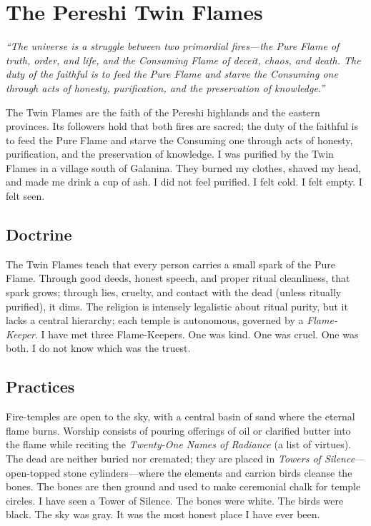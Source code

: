 \documentclass{book}
\begin{document}
\section{The Pereshi Twin Flames}

\textit{``The universe is a struggle between two primordial fires---the Pure Flame of truth, order, and life, and the Consuming Flame of deceit, chaos, and death. The duty of the faithful is to feed the Pure Flame and starve the Consuming one through acts of honesty, purification, and the preservation of knowledge.''}

The Twin Flames are the faith of the Pereshi highlands and the eastern provinces. Its followers hold that both fires are sacred; the duty of the faithful is to feed the Pure Flame and starve the Consuming one through acts of honesty, purification, and the preservation of knowledge. I was purified by the Twin Flames in a village south of Galanina. They burned my clothes, shaved my head, and made me drink a cup of ash. I did not feel purified. I felt cold. I felt empty. I felt seen.

\subsection{Doctrine}

The Twin Flames teach that every person carries a small spark of the Pure Flame. Through good deeds, honest speech, and proper ritual cleanliness, that spark grows; through lies, cruelty, and contact with the dead (unless ritually purified), it dims. The religion is intensely legalistic about ritual purity, but it lacks a central hierarchy; each temple is autonomous, governed by a \textit{Flame-Keeper}. I have met three Flame-Keepers. One was kind. One was cruel. One was both. I do not know which was the truest.

\subsection{Practices}

Fire-temples are open to the sky, with a central basin of sand where the eternal flame burns. Worship consists of pouring offerings of oil or clarified butter into the flame while reciting the \textit{Twenty-One Names of Radiance} (a list of virtues). The dead are neither buried nor cremated; they are placed in \textit{Towers of Silence}---open-topped stone cylinders---where the elements and carrion birds cleanse the bones. The bones are then ground and used to make ceremonial chalk for temple circles. I have seen a Tower of Silence. The bones were white. The birds were black. The sky was gray. It was the most honest place I have ever been.
\end{document}
